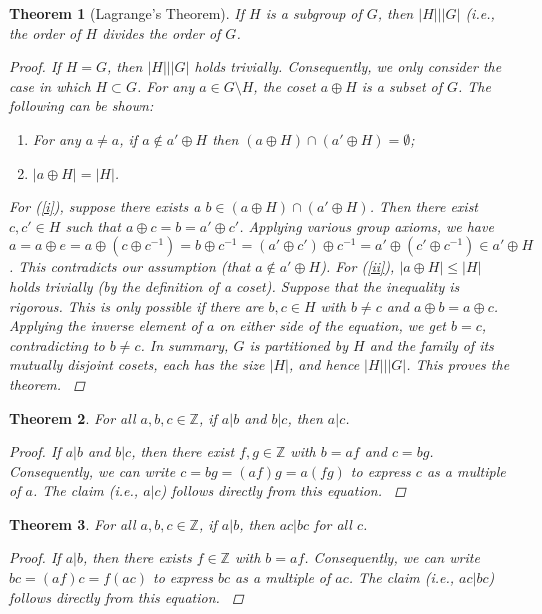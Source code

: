 \documentclass{book}
\newcommand{\ZZZ}{\ensuremath{\mathbb{Z}}}
\newtheorem{theo}{Theorem}
\begin{document}
\begin{theo}[Lagrange's Theorem]
If $H$ is a subgroup of $G$, then $\left|H\right||\left|G\right|$ (i.e., the order of $H$ divides the order of $G$.
\begin{proof}
If $H=G$, then $\left|H\right||\left|G\right|$ holds trivially. Consequently, we only consider the case in which $H\subset G$. For any $a\in G\setminus H$, the coset $a\oplus H$ is a subset of $G$. The following can be shown:
\begin{enumerate}
 \item \label{i} For any $a \neq a$, if $a\notin a'\oplus H$ then $\left(a\oplus H\right)\cap\left(a'\oplus H\right)=\emptyset$;
 \item \label{ii} $\left|a\oplus H\right|=\left|H\right|$.
\end{enumerate}
For (\ref{i}{}), suppose there exists a $b\in\left(a\oplus H\right)\cap\left(a'\oplus H\right)$. Then there exist $c,c'\in H$ such that $a\oplus c=b=a'\oplus c'$. Applying various group axioms, we have $a=a\oplus e= a\oplus\left(c\oplus c^{-1}\right)=b\oplus c^{-1}=\left(a'\oplus c'\right)\oplus c^{-1}=a'\oplus\left(c'\oplus c^{-1}\right)\in a'\oplus H$. This contradicts our assumption (that $a\notin a'\oplus H$).
For (\ref{ii}{}), $\left|a\oplus H\right|\leq\left|H\right|$ holds trivially (by the definition of a coset). Suppose that the inequality is rigorous. This is only possible if there are $b,c\in H$ with $b\neq c$ and $a\oplus b = a\oplus c$. Applying the inverse element of $a$ on either side of the equation, we get $b=c$, contradicting to $b\neq c$.
In summary, $G$ is partitioned by $H$ and the family of its mutually disjoint cosets, each has the size $\left|H\right|$, and hence $\left|H\right||\left|G\right|$. This proves the theorem.
\cite{Oppliger:2011:CC:2049860}
\end{proof}
\end{theo}

\begin{theo}
For all $a,b,c\in\ZZZ$, if $a|b$ and $b|c$, then $a|c$.
\begin{proof}
If $a|b$ and $b|c$, then there exist $f,g\in\ZZZ$ with $b=af$ and $c=bg$. Consequently, we can write $c=bg= \left(af\right)g = a\left(fg\right)$ to express $c$ as a multiple of $a$. The claim (i.e., $a|c$) follows directly from this equation.
\cite{Oppliger:2011:CC:2049860}
\end{proof}
\end{theo}

\begin{theo}
For all $a,b,c\in\ZZZ$, if $a|b$, then $ac|bc$ for all $c$.
\begin{proof}
If $a|b$, then there exists $f\in\ZZZ$ with $b=af$. Consequently, we can write $bc=\left(af\right)c=f\left(ac\right)$ to express $bc$ as a multiple of $ac$. The claim (i.e., $ac|bc$) follows directly from this equation.
\cite{Oppliger:2011:CC:2049860}
\end{proof}
\end{theo}
\end{document}
